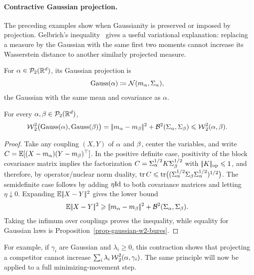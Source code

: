 \paragraph{Contractive Gaussian projection.}

The preceding examples show when Gaussianity is preserved or imposed by projection. Gelbrich's inequality~\citep{gelbrich1990formula} gives a useful variational explanation: replacing a measure by the Gaussian with the same first two moments cannot increase its Wasserstein distance to another similarly projected measure.

\begin{defn}\label{def-gaussian-projection}
For \(\alpha\in\mathcal{P}_2(\mathbb{R}^d)\), its Gaussian projection is
\[
	\operatorname{Gauss}(\alpha)
	\coloneqq
	\mathcal{N}(m_\alpha,\Sigma_\alpha),
\]
the Gaussian with the same mean and covariance as \(\alpha\).
\end{defn}

\begin{thm}\label{thm-gelbrich-projection}
	For every $\alpha,\beta\in\mathcal{P}_2(\mathbb{R}^d)$,
	\[
		\operatorname{\mathcal{W}}_2^2\bigl(\operatorname{Gauss}(\alpha),\operatorname{Gauss}(\beta)\bigr)
		=
		|\!| m_\alpha-m_\beta |\!|^2+\mathcal{B}^2(\Sigma_\alpha,\Sigma_\beta)
		\leqslant
		\operatorname{\mathcal{W}}_2^2(\alpha,\beta).
	\]
\end{thm}

\begin{proof}
	Take any coupling $(X,Y)$ of $\alpha$ and $\beta$, center the variables, and write $C=\mathbb{E}[(X-m_\alpha)(Y-m_\beta)^\top]$. In the positive definite case, positivity of the block covariance matrix implies the factorization $C=\Sigma_\alpha^{1/2}K\Sigma_\beta^{1/2}$ with $|\!| K |\!|_{\mathrm{op}}\leqslant1$, and therefore, by operator/nuclear norm duality, $\operatorname{tr} C\leqslant \operatorname{tr}\bigl((\Sigma_\alpha^{1/2}\Sigma_\beta\Sigma_\alpha^{1/2})^{1/2}\bigr)$.
	The semidefinite case follows by adding $\eta\mathrm{Id}$ to both covariance matrices and letting $\eta\downarrow0$.
	Expanding $\mathbb{E}|\!| X-Y |\!|^2$ gives the lower bound
	\[
		\mathbb{E}|\!| X-Y |\!|^2
		\geqslant
		|\!| m_\alpha-m_\beta |\!|^2+\mathcal{B}^2(\Sigma_\alpha,\Sigma_\beta).
	\]
	Taking the infimum over couplings proves the inequality, while equality for Gaussian laws is Proposition~\ref{prop-gaussian-w2-bures}.
\end{proof}

For example, if $\gamma_i$ are Gaussian and $\lambda_i\geq0$, this contraction shows that projecting a competitor cannot increase $\sum_i\lambda_i\operatorname{\mathcal{W}}_2^2(\alpha,\gamma_i)$. The same principle will now be applied to a full minimizing-movement step.

